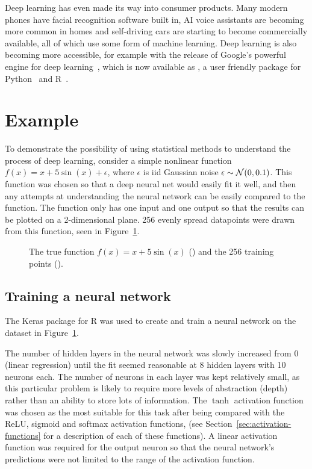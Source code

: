 Deep learning has even made its way into consumer products.
Many modern phones have facial recognition software built in, AI voice assistants are becoming more common in homes and self-driving cars are starting to become commercially available, all of which use some form of machine learning.
Deep learning is also becoming more accessible, for example with the release of Google's powerful  engine for deep learning~\autocite{abadi2016}, which is now available as , a user friendly package for Python~\autocite{chollet2015} and R~\autocite{allaire2018}.

\section{Example}

To demonstrate the possibility of using statistical methods to understand the process of deep learning, consider a simple nonlinear function \(f(x) = x + 5 \sin(x) + \epsilon\), where \(\epsilon\) is iid Gaussian noise \(\epsilon \sim \mathcal{N}(0, 0.1)\).
This function was chosen so that a deep neural net would easily fit it well, and then any attempts at understanding the neural network can be easily compared to the  function.
The function only has one input and one output so that the results can be plotted on a 2-dimensional plane.
256 evenly spread datapoints were drawn from this function, seen in Figure~\ref{fig:sin-x-dataset}.

\begin{figure}[htbp]
	\centering
	
	\caption{The true function \(f(x) = x + 5 \sin(x)\) (\truthcolour) and the 256 training points (\traincolour).}
	\label{fig:sin-x-dataset}
\end{figure}

\subsection{Training a neural network}

The Keras package for R \autocite{allaire2018} was used to create and train a neural network on the dataset in Figure~\ref{fig:sin-x-dataset}.

The number of hidden layers in the neural network was slowly increased from 0 (linear regression) until the fit seemed reasonable at 8 hidden layers with 10 neurons each.
The number of neurons in each layer was kept relatively small, as this particular problem is likely to require more levels of abstraction (depth) rather than an ability to store lots of information.
The \(\tanh\) activation function was chosen as the most suitable for this task after being compared with the \ac{ReLU}, sigmoid and softmax activation functions, (see Section~\ref{sec:activation-functions} for a description of each of these functions).
A linear activation function was required for the output neuron so that the neural network's predictions were not limited to the range of the activation function.

